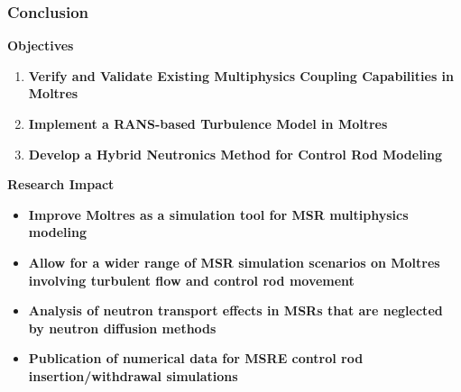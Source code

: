 \begin{frame}
  \frametitle{Conclusion}
  \begin{block}{\textbf{Objectives}}
    \begin{enumerate}
      \item \textbf{Verify and Validate Existing Multiphysics Coupling Capabilities in Moltres}
      \item \textbf{Implement a RANS-based Turbulence Model in Moltres}
      \item \textbf{Develop a Hybrid Neutronics Method for Control Rod Modeling}
    \end{enumerate}
  \end{block}
  \pause
  \begin{block}{\textbf{Research Impact}}
    \begin{itemize}
      \item \textbf{Improve Moltres as a simulation tool for MSR multiphysics modeling}
      \item \textbf{Allow for a wider range of MSR simulation scenarios on Moltres involving
        turbulent flow and control rod movement}
      \item \textbf{Analysis of neutron transport effects in MSRs that are neglected by neutron
        diffusion methods}
      \item \textbf{Publication of numerical data for MSRE control rod insertion/withdrawal
        simulations}
    \end{itemize}
  \end{block}
\end{frame}
